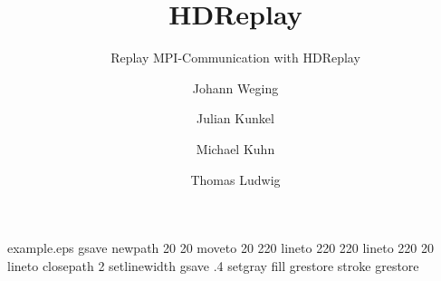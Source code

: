 %
%
%
%
%
\begin{filecontents*}{example.eps}
gsave
newpath
  20 20 moveto
  20 220 lineto
  220 220 lineto
  220 20 lineto
closepath
2 setlinewidth
gsave
  .4 setgray fill
grestore
stroke
grestore
\end{filecontents*}
%
\RequirePackage{fix-cm}
%
\documentclass[twocolumn]{svjour3}          %
%
\smartqed  %
%
\usepackage{graphicx}
\usepackage{listings}
%
%
%
%
%


\title{HDReplay%
}
\subtitle{Replay MPI-Communication with HDReplay}


\author{Johann Weging \and Julian Kunkel \and Michael Kuhn \and Thomas Ludwig}



